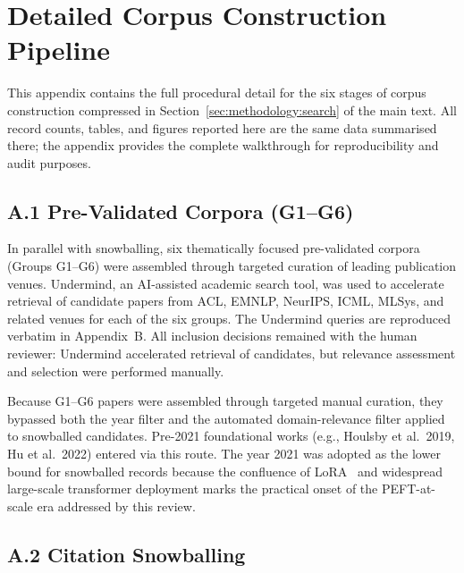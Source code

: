 
\section[\appendixname~\thesection]{Detailed Corpus Construction Pipeline}
\label{sec:appendix:corpus_pipeline}

This appendix contains the full procedural detail for the six stages of
corpus construction compressed in Section~\ref{sec:methodology:search} of the
main text. All record counts, tables, and figures reported here are the same
data summarised there; the appendix provides the complete walkthrough for
reproducibility and audit purposes.

\subsection*{A.1 Pre-Validated Corpora (G1--G6)}

In parallel with snowballing, six thematically focused pre-validated corpora
(Groups G1--G6) were assembled through targeted curation of leading
publication venues. Undermind, an AI-assisted academic search tool, was used
to accelerate retrieval of candidate papers from ACL, EMNLP, NeurIPS, ICML,
MLSys, and related venues for each of the six groups. The Undermind queries
are reproduced verbatim in Appendix~B. All inclusion decisions remained with
the human reviewer: Undermind accelerated retrieval of candidates, but
relevance assessment and selection were performed manually.

Because G1--G6 papers were assembled through targeted manual curation, they
bypassed both the year filter and the automated domain-relevance filter
applied to snowballed candidates. Pre-2021 foundational works (e.g.,
Houlsby et al.\ 2019, Hu et al.\ 2022) entered via this route. The year 2021
was adopted as the lower bound for snowballed records because the confluence
of LoRA~\cite{Hu2022} and widespread large-scale transformer deployment marks
the practical onset of the PEFT-at-scale era addressed by this review.

\subsection*{A.2 Citation Snowballing}

